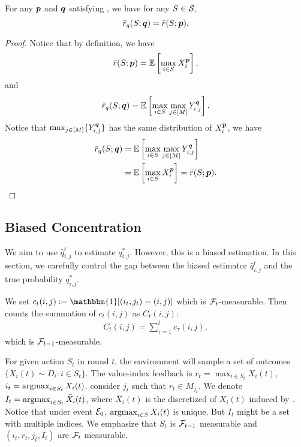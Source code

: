 \begin{lemma}\label{lemma:r-q-r-formal}
For any ${\bm{p}}$ and ${\bm{q}}$ satisfying , we have for any $S \in {\mathcal{S}}$, $$\bar r_q(S; {\bm{q}}) = \bar r(S; {\bm{p}}).$$
\begin{proof}
    Notice that by definition, we have
    \begin{align*}
        \bar r(S; {\bm{p}}) = \mathbb{E}\left[\max_{i\in S} X_i^{\bm{p}}\right],
    \end{align*}
    and
    \begin{align*}
        \bar r_q(S; {\bm{q}}) = \mathbb{E}\left[\max_{i \in S} \max_{j \in [M]} Y_{i,j}^{\bm{q}}\right].
    \end{align*}
    Notice that $\max_{j\in[M]}\{Y_{i,j}^{\bm{q}}\}$ has the same distribution of $X_i^{\bm{p}}$, we have
    \begin{align*}
        \bar r_q(S; {\bm{q}}) &= \mathbb{E}\left[\max_{i \in S} \max_{j \in [M]} Y_{i,j}^{\bm{q}}\right] \\
        &= \mathbb{E}\left[\max_{i \in S} X_i^{\bm{p}}\right] = \bar r(S; {\bm{p}}).
    \end{align*}
\end{proof}
\end{lemma}

\subsection{Biased Concentration}
We aim to use $\hat q_{i,j}^t$ to estimate $q_{i,j}^*$. However, this is a biased estimation. In this section, we carefully control the gap between the biased estimator $\hat q_{i,j}^t$ and the true probability $q^*_{i,j}$.


We set $c_t(i, j) := \mathbbm{1}[(i_t, j_t) = (i, j)]$ which is ${\mathcal{F}}_t$-measurable. Then  counts the summation of $c_t(i,j)$ as $C_t(i,j)$:
\begin{align*}
    C_t(i,j) = \sum_{\tau = 1}^t c_\tau(i,j),
\end{align*}
which is ${\mathcal{F}}_{t-1}$-measurable. 

For given action $S_t$ in round $t$, the environment will sample a set of outcomes $\{X_i(t) \sim D_i : i \in S_t\}$. The value-index feedback is $r_t = \max_{i \in S_t} X_i(t)$, $i_t = \operatorname*{argmax}_{i \in S_t} X_i(t)$.  consider $j_t$ such that $r_t \in M_{j_t}$. We denote $I_t = \operatorname*{argmax}_{i \in S_t} \bar X_i(t)$, where $\bar X_i(t)$ is the discretized of $X_i(t)$ induced by . Notice that under event ${\mathcal{E}}_0$, $\operatorname*{argmax}_{i \in S} X_i(t)$ is unique. But $I_t$ might be a set with multiple indices. We emphasize that $S_t$ is ${\mathcal{F}}_{t-1}$ measurable and $(i_t, r_t, j_t, I_t)$ are ${\mathcal{F}}_t$ measurable.

